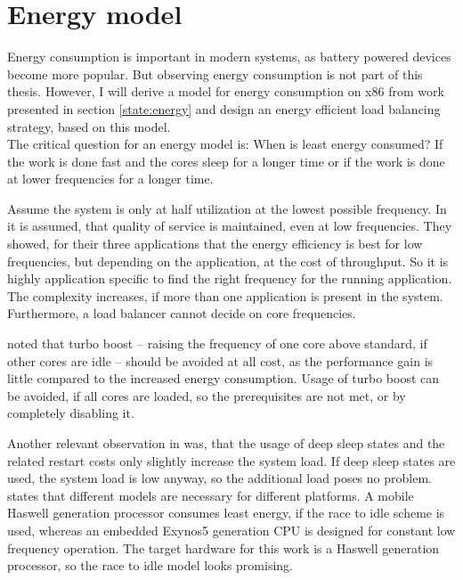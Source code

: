 \section{Energy model}
\label{design:energy}

Energy consumption is important in modern systems, as battery powered devices
become more popular.
But observing energy consumption is not part of this thesis.
However, I will derive a model for energy consumption on x86 from work presented
in section \ref{state:energy} and design an energy efficient load balancing
strategy, based on this model.
\\

The critical question for an energy model is:
When is least energy consumed?
If the work is done fast and the cores sleep for a longer time or if the work
is done at lower frequencies for a longer time.

Assume the system is only at half utilization at the lowest possible frequency.
In \cite{le_sueur_slow_2011} it is assumed, that quality of service is
maintained, even at low frequencies.
They showed, for their three applications that the energy efficiency is best
for low frequencies, but depending on the application, at the cost of
throughput.
So it is highly application specific to find the right frequency for the
running application.
The complexity increases, if more than one application is present in the
system.
Furthermore, a load balancer cannot decide on core frequencies.

\citeauthor{le_sueur_slow_2011} noted that turbo boost -- raising the frequency
of one core above standard, if other cores are idle -- should be avoided at
all cost, as the performance gain is little compared to the increased energy
consumption.
Usage of turbo boost can be avoided, if all cores are loaded, so the
prerequisites are not met, or by completely disabling it.

Another relevant observation in \cite{le_sueur_slow_2011} was, that the usage
of deep sleep states and the related restart costs only slightly increase the
system load.
If deep sleep states are used, the system load is low anyway, so the additional
load poses no problem.
\\

\cite{imes_poet_2015} states that different models are necessary for different
platforms.
A mobile Haswell generation processor consumes least energy, if the race to
idle scheme is used, whereas an embedded Exynos5 generation CPU is designed for
constant low frequency operation.
The target hardware for this work is a Haswell generation processor, so the
race to idle model looks promising.
\\

